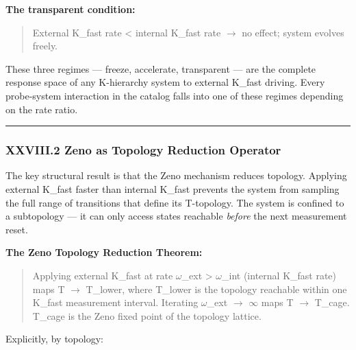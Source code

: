 \documentclass[12pt,a4paper]{article}
\begin{document}
\textbf{The transparent condition:}

\begin{quote}
External K\_fast rate \textless{} internal K\_fast rate $\rightarrow$ no effect; system evolves freely.

\end{quote}

These three regimes --- freeze, accelerate, transparent --- are the complete response space of any K-hierarchy system to external K\_fast driving. Every probe-system interaction in the catalog falls into one of these regimes depending on the rate ratio.

\begin{center}
\rule{0.5\textwidth}{0.4pt}
\end{center}

\subsubsection{XXVIII.2 Zeno as Topology Reduction Operator}

The key structural result is that the Zeno mechanism reduces topology. Applying external K\_fast faster than internal K\_fast prevents the system from sampling the full range of transitions that define its T-topology. The system is confined to a subtopology --- it can only access states reachable \emph{before} the next measurement reset.

\textbf{The Zeno Topology Reduction Theorem:}

\begin{quote}
Applying external K\_fast at rate $\omega$\_ext \textgreater{} $\omega$\_int (internal K\_fast rate) maps T $\rightarrow$ T\_lower, where T\_lower is the topology reachable within one K\_fast measurement interval. Iterating $\omega$\_ext $\rightarrow$ $\infty$ maps T $\rightarrow$ T\_cage. T\_cage is the Zeno fixed point of the topology lattice.

\end{quote}

Explicitly, by topology:
\end{document}
